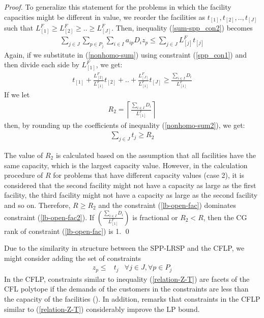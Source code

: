 \begin{proof}
To generalize this statement for the problems in which the facility
capacities might be different in value, we reorder the facilities as
$t_{[1]},t_{[2]},..,t_{[J]}$ such that $L^F_{[1]} \geq L^F_{[2]} \geq 
..\geq L^F_{[J]}$. Then, inequality (\ref{sum-spp_con2}) becomes 
\begin{eqnarray}
\sum_{j \in J} \sum_{p \in P_j} \sum_{i \in I} a_{ip} D_i z_{p} \leq   \sum_{j \in J} L^F_{[j]}t_{[j]} \label{nonhomo-sum}
\end{eqnarray}  
Again, if we substitute in (\ref{nonhomo-sum}) using constraint (\ref{spp_con1}) and 
then divide each side by $L^F_{[1]}$, 
we get:
\begin{eqnarray}
\label{nonhomo-sum2}
 t_{[1]}+\frac{L^F_{[2]}}{L^F_{[1]}}t_{[2]}+..+ \frac{L^F_{[J]}}{L^F_{[1]}}t_{[J]} \geq \frac {\sum_{i \in I}D_i}{L^F_{[1]}} 
\end{eqnarray} 
If we let 
\begin{eqnarray}
 R_2 =\left \lceil \frac{\sum_{i \in I }D_i}{L^F_{[1]}} \right \rceil \nonumber 
\end{eqnarray}   
then, by rounding up the coefficients of inequality (\ref{nonhomo-sum2}), we get:
\begin{eqnarray}
\label{lb-open-fac2}
 \sum_{j \in J}t_j \geq R_2 
\end{eqnarray}  

The value of $R_2$ is calculated based on the assumption that all facilities have the 
same capacity, which is the largest capacity value. However, in the calculation procedure 
of $R$ for problems that have different capacity values (case 2), it is considered that the 
second facility might not have a capacity as large as the first facility, the third facility 
might not have a capacity as large as the second facility and so on.  Therefore, 
$R \geq R_2$ and the constraint (\ref{lb-open-fac}) dominates constraint 
(\ref{lb-open-fac2}). If $\left(\frac{\sum_{i \in I }D_i}{L^F_{[1]}}\right)$ is fractional or 
$R_2<R$, then the CG rank of constraint (\ref{lb-open-fac}) is 1. \qed
\end{proof}

Due to the similarity in structure between the SPP-LRSP and the CFLP, we might consider 
adding the set of constraints 
\begin{eqnarray}
z_{p} \leq & t_{j}  & \forall j \in J, \forall p \in P_{j} \label{relation-Z-T}
\end{eqnarray}
In the CFLP, constraints similar to inequality (\ref{relation-Z-T}) are facets of the 
CFL polytope if the demands of the customers in the constraints are less than the capacity 
of the facilities (\citet{Leung}). In addition, \citet{Daskin} remarks that constraints 
in the CFLP similar to (\ref{relation-Z-T}) considerably improve the LP bound. 

